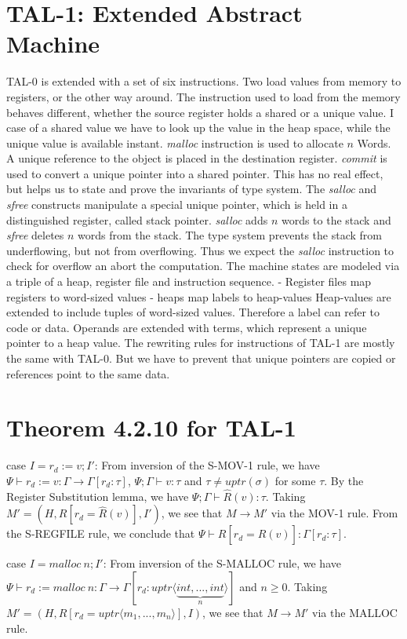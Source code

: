 \documentclass[acmlarge]{acmart}
\begin{document}
	\section{TAL-1: Extended Abstract Machine}
	TAL-0 is extended with a set of six instructions.
	Two load values from memory to registers, or the other way around.
	The instruction used to load from the memory behaves different, whether the source register holds a shared or a unique value. I case of a shared value we have to look up the value in the heap space, while the unique value is available instant.
	\emph{malloc} instruction is used to allocate $n$ Words. A unique reference to the object is placed in the destination register.
	\emph{commit} is used to convert a unique pointer into a shared pointer. This has no real effect, but helps us to state and prove the invariants of type system. The \emph{salloc} and \emph{sfree} constructs manipulate a special unique pointer, which is held in a distinguished register, called stack pointer. \emph{salloc} adds $n$ words to the stack and \emph{sfree} deletes $n$ words from the stack. The type system prevents the stack from underflowing, but not from overflowing.
	Thus we expect the \emph{salloc} instruction to check for overflow an abort the computation.
	The machine states are modeled via a triple of a heap, register file and instruction sequence.
	- Register files map registers to word-sized values
	- heaps map labels to heap-values
	Heap-values are extended to include tuples of word-sized values. Therefore a label can refer to code or data.
	Operands are extended with terms, which represent a unique pointer to a heap value.
	The rewriting rules for instructions of TAL-1 are mostly the same with TAL-0. But we have to prevent that unique pointers are copied or references point to the same data.


	\section{Theorem  4.2.10 for TAL-1}

	case $I = r_d := v; I'$: From inversion of the S-MOV-1 rule, we have $\Psi \vdash r_d := v : \Gamma \rightarrow \Gamma[r_d : \tau]$, $\Psi; \Gamma \vdash v : \tau$ and $\tau \neq uptr(\sigma)$ for some $\tau$. By the Register Substitution lemma, we have $\Psi; \Gamma \vdash \hat{R}(v) : \tau$. 	Taking $M' = (H,R[r_d = \hat{R}(v)], I')$, we see that $M \rightarrow M'$ via the MOV-1 rule. From the S-REGFILE rule, we conclude that $\Psi \vdash R[r_d = \hat{R}(v)] : \Gamma [r_d : \tau]$.

	case $I = malloc\ n; I'$: From inversion of the S-MALLOC rule, we have $\Psi \vdash r_d := malloc\ n : \Gamma \rightarrow \Gamma [r_d : uptr \langle \underbrace{int, ..., int}_{n} \rangle ]$ and $n \geq 0$. Taking $M' = (H, R[r_d = uptr \langle m_1, ..., m_n \rangle], I)$, we see that $M \rightarrow M'$ via the MALLOC rule.

	
	
\end{document}
